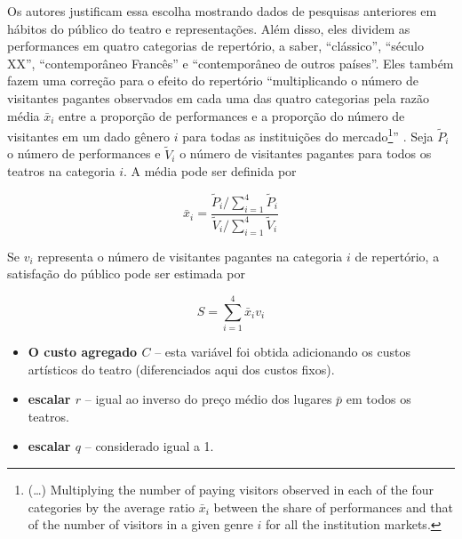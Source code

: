 \documentclass[a4paper, 12pt, openright, oneside, german, french, english, brazil]{abntex2}
\begin{document}
	Os autores justificam essa escolha mostrando dados de pesquisas anteriores em hábitos do público do teatro e representações. Além disso, eles dividem as performances em quatro categorias de repertório, a saber, ``clássico'', ``século XX'', ``contemporâneo Francês'' e ``contemporâneo de outros países''. Eles também fazem uma correção para o efeito do repertório ``multiplicando o número de visitantes pagantes observados em cada uma das quatro categorias pela razão média $\bar{x}_i$ entre a proporção de performances e a proporção do número de visitantes em um dado gênero $i$ para todas as instituições do mercado\footnote{(\dots) Multiplying the number of paying visitors observed  in each of the four categories by the average ratio $\bar{x}_i$ between the share of performances and that of the number of visitors in a given genre $i$ for all the institution markets.}'' \cite[p. 265]{biencourt2002market}. Seja $\tilde{P}_i$ o número de performances e $\tilde{V}_i$ o número de visitantes pagantes para todos os teatros na categoria $i$. A média pode ser definida por
	
	\begin{equation}
	\label{repertory-effect-correction}
	\bar{x}_i = \frac{\tilde{P}_i / \sum_{i=1}^{4}\tilde{P}_i}{\tilde{V}_i / \sum_{i=1}^{4}\tilde{V}_i}	
	\end{equation}
	
	
	Se $v_i$ representa o número de visitantes pagantes na categoria $i$ de repertório, a satisfação do público pode ser estimada por
	
	\begin{equation}
	\label{satisfaction-corrected}
	S = \sum_{i=1}^{4}\bar{x}_i v_i
	\end{equation}
	
	

	
	\begin{itemize}
		\item \textbf{O custo agregado $C$} -- esta variável foi obtida adicionando os custos artísticos do teatro (diferenciados aqui dos custos fixos).
		
		\item \textbf{escalar $r$} -- igual ao inverso do preço médio dos lugares $\bar{p}$ em todos os teatros.
		
		\item \textbf{escalar $q$} -- considerado igual a 1.
	\end{itemize}
	
\end{document}
